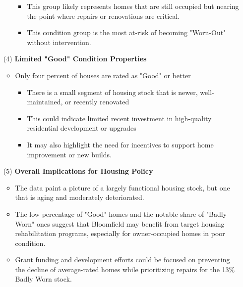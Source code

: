 \begin{itemize}
\begin{itemize}
\begin{itemize}
            \item This group likely represents homes that are still occupied but nearing the point where repairs or renovations are critical.
            \item This condition group is the most at-risk of becoming "Worn-Out" without intervention.
        \end{itemize}
    \end{itemize}
    \item [(4)] \textbf{\textcolor{coBalt}{Limited "Good" Condition Properties}}
    \begin{itemize}
        \item Only four percent of houses are rated as "Good" or better
        \begin{itemize}
            \item There is a small segment of housing stock that is newer, well-maintained, or recently renovated
            \item This could indicate limited recent investment in high-quality residential development or upgrades
            \item It may also highlight the need for incentives to support home improvement or new builds.
        \end{itemize}
    \end{itemize}
    \pagebreak
    \item [(5)] \textbf{\textcolor{coBalt}{Overall Implications for Housing Policy}}
    \begin{itemize}
        \item The data paint a picture of a largely functional housing stock, but one that is aging and moderately deteriorated.
        \item The low percentage of "Good" homes and the notable share of "Badly Worn" ones suggest that Bloomfield may benefit from target housing rehabilitation programs, especially for owner-occupied homes in poor condition.
        \item Grant funding and development efforts could be focused on preventing the decline of average-rated homes while prioritizing repairs for the 13\% Badly Worn stock.
    \end{itemize}
\end{itemize}

\newpage
\thispagestyle{empty}
\begin{landscape}
    
\end{landscape}
\newpage

